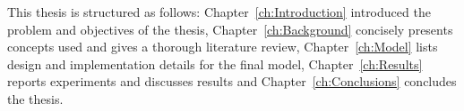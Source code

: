 This thesis is structured as follows: Chapter~\ref{ch:Introduction} introduced the problem and objectives of the thesis, Chapter~\ref{ch:Background} concisely presents concepts used and gives a thorough literature review, Chapter~\ref{ch:Model} lists design and implementation details for the final model, Chapter~\ref{ch:Results} reports experiments and discusses results and Chapter~\ref{ch:Conclusions} concludes the thesis. 
